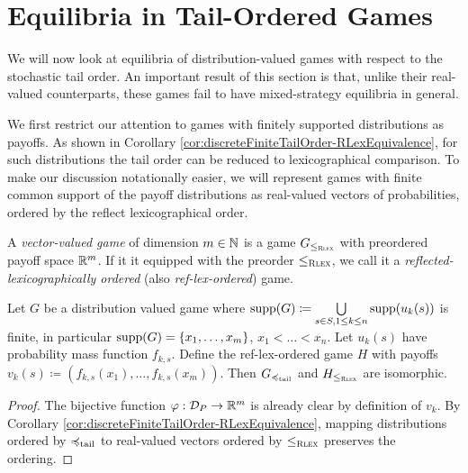 \documentclass[a4paper]{scrreprt}
\let\phi\varphi
\begin{document}
    
    \section{Equilibria in Tail-Ordered Games}
    We will now look at equilibria of distribution-valued games with respect to the stochastic tail order.
    An important result of this section is that, unlike their real-valued counterparts, these games fail to have mixed-strategy equilibria in general.
    
    We first
    restrict our attention to games with finitely supported distributions as payoffs.
    As shown in Corollary \ref{cor:discreteFiniteTailOrder-RLexEquivalence}, for such distributions the tail order can be reduced to lexicographical comparison.
    To make our discussion notationally easier, we will represent games with finite common support of the payoff distributions as real-valued vectors of probabilities, ordered by the reflect lexicographical order.
    \begin{defn}
        A \emph{vector-valued game} of dimension $m \in \mathbb{N}$ is a game $G_{\leq_{\textsc{Rlex}}}$ with preordered payoff space $\mathbb{R}^m$.
        If it it equipped with the preorder $\leq_{\textsc{Rlex}}$, we call it a \emph{reflected-lexicographically ordered} (also \emph{ref-lex-ordered}) game.
    \end{defn}

    \begin{lemma}
        Let $G$ be a distribution valued game where $\operatorname{supp}(G) \coloneqq \bigcup\limits_{s \in S, 1 \leq k \leq n} \operatorname{supp}(u_k(s))$ is finite, 
        in particular $\operatorname{supp}(G) = \{x_1, \dots, x_m\}$, $x_1 < \dots < x_n$. Let $u_k(s)$ have probability mass function $f_{k, s}$.
        Define the ref-lex-ordered game $H$ with payoffs
        $v_k(s) \coloneqq (f_{k, s}(x_1), \dots, f_{k, s}(x_m))$.
        Then $G_{\preccurlyeq_{\text{tail}}}$ and $H_{\leq_{\textsc{Rlex}}}$ are isomorphic.
    \end{lemma}
    \begin{proof}
        The bijective function $\phi: \DP \to \R^m$ is already clear by definition of $v_k$.
        By Corollary \ref{cor:discreteFiniteTailOrder-RLexEquivalence}, mapping distributions ordered by $\preccurlyeq_{\text{tail}}$ to real-valued vectors ordered by $\leq_{\textsc{Rlex}}$ preserves the ordering.
    \end{proof}
\end{document}
